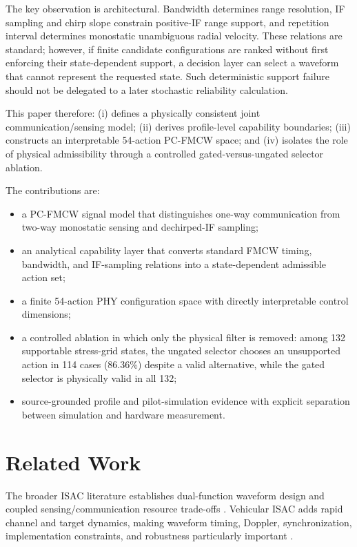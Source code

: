 \documentclass[conference,a4paper]{IEEEtran}
\begin{document}
The key observation is architectural. Bandwidth determines range resolution, IF sampling and chirp slope constrain positive-IF range support, and repetition interval determines monostatic unambiguous radial velocity. These relations are standard; however, if finite candidate configurations are ranked without first enforcing their state-dependent support, a decision layer can select a waveform that cannot represent the requested state. Such deterministic support failure should not be delegated to a later stochastic reliability calculation.

This paper therefore: (i) defines a physically consistent joint communication/sensing model; (ii) derives profile-level capability boundaries; (iii) constructs an interpretable 54-action PC-FMCW space; and (iv) isolates the role of physical admissibility through a controlled gated-versus-ungated selector ablation.

The contributions are:
\begin{itemize}
\item a PC-FMCW signal model that distinguishes one-way communication from two-way monostatic sensing and dechirped-IF sampling;
\item an analytical capability layer that converts standard FMCW timing, bandwidth, and IF-sampling relations into a state-dependent admissible action set;
\item a finite 54-action PHY configuration space with directly interpretable control dimensions;
\item a controlled ablation in which only the physical filter is removed: among 132 supportable stress-grid states, the ungated selector chooses an unsupported action in 114 cases (86.36\%) despite a valid alternative, while the gated selector is physically valid in all 132;
\item source-grounded profile and pilot-simulation evidence with explicit separation between simulation and hardware measurement.
\end{itemize}

\section{Related Work}
The broader ISAC literature establishes dual-function waveform design and coupled sensing/communication resource trade-offs \cite{liu2022isac,wang2022isac,wang2024isac}. Vehicular ISAC adds rapid channel and target dynamics, making waveform timing, Doppler, synchronization, implementation constraints, and robustness particularly important \cite{vehicular2022isac,ma2026vehicularisac}.
\end{document}
